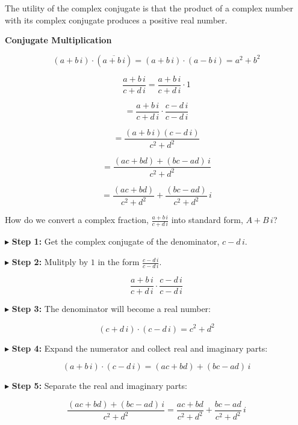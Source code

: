 \documentclass{ximera}
\begin{document}
The utility of the complex conjugate is that the product of a complex number with its complex conjugate produces a positive real number.



\begin{observation} \textbf{\textcolor{-red!75}{Conjugate Multiplication}}

\[
(a + b \, i) \cdot (\overline{a + b \, i}) = (a + b \, i) \cdot (a - b \, i) = a^2 + b^2
\]

\end{observation}






\[
\frac{a + b \, i}{c + d \, i} = \frac{a + b \, i}{c + d \, i}  \cdot 1 
\]

\[
= \frac{a + b \, i}{c + d \, i} \cdot \frac{c - d \, i}{c - d \, i} 
\]

\[
= \frac{(a + b \, i)(c - d \, i)}{c^2 + d^2} 
\]

\[
= \frac{(ac + bd) + (bc - ad) \, i}{c^2 + d^2} 
\]

\[
= \frac{(ac + bd)}{c^2 + d^2}  + \frac{(bc - ad)}{c^2 + d^2} \, i
\]







\begin{procedure}


How do we convert a complex fraction, $\frac{a + b \, i}{c + d \, i}$ into standard form, $A + B \, i$?



$\blacktriangleright$ \textbf{Step 1:}   Get the complex conjugate of the denominator, $c - d \, i$.


$\blacktriangleright$ \textbf{Step 2:} Mulitply by $1$ in the form $\frac{c - d \, i}{c - d \, i}$.

\[
\frac{a + b \, i}{c + d \, i} \cdot \frac{c - d \, i}{c - d \, i}
\]

$\blacktriangleright$ \textbf{Step 3:}  The denominator will become a real number:  

\[ (c + d \, i) \cdot (c - d \, i) = c^2 + d^2 \]



$\blacktriangleright$ \textbf{Step 4:}  Expand the numerator and collect real and imaginary parts: 

\[ (a + b \, i) \cdot (c - d \, i) = (ac + bd) + (bc - ad) \, i \]


$\blacktriangleright$ \textbf{Step 5:} Separate the real and imaginary parts: 

\[
\frac{(ac + bd) + (bc - ad) \, i}{c^2 + d^2} = \frac{ac + bd}{c^2 + d^2} + \frac{bc - ad}{c^2 + d^2} \, i
\] 



\end{procedure}
\end{document}
